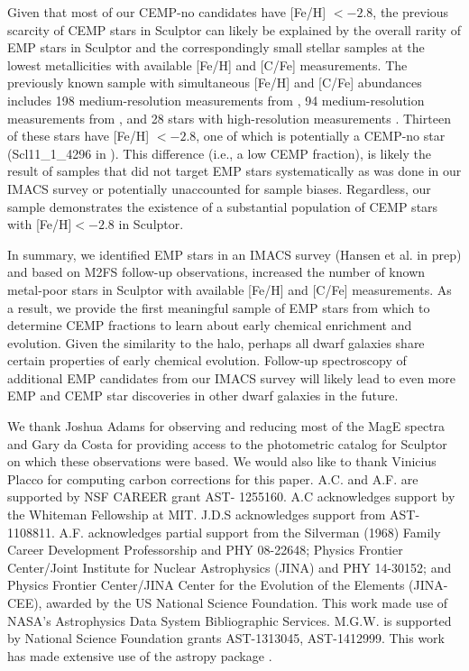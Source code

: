 \documentclass{emulateapj-rtx4}
\begin{document}
Given that most of our CEMP-no candidates have [Fe/H] $< -2.8$, the previous scarcity of CEMP stars in 
Sculptor can likely be explained by the overall rarity of EMP stars in Sculptor and the correspondingly small 
stellar samples at the lowest metallicities with available [Fe/H] and [C/Fe]
measurements. The previously known sample with simultaneous [Fe/H] and [C/Fe] abundances includes 
198 medium-resolution measurements from \citet{kgz+15}, 94 medium-resolution measurements from
\citet{lbp+16}, and 28 stars with high-resolution measurements 
\citep{svt+03, gsw+05, fks+10, tjh+10, kc+12, sht+13, sts+15,
jnm+15,sjf+15}. Thirteen of these stars have [Fe/H] $< -2.8$, one of which is potentially 
a CEMP-no star (Scl11\_1\_4296 in \citet{sjf+15}). This difference (i.e., a low CEMP fraction),
is likely the result of samples that did not target EMP stars systematically as was done in our
IMACS survey or potentially unaccounted for sample biases. Regardless, our sample demonstrates the existence of a substantial population of CEMP stars with [Fe/H]$< -2.8$ in Sculptor.

In summary,  we identified EMP stars in an IMACS survey (Hansen et al. in prep) and based on M2FS follow-up observations,
increased the number of known metal-poor stars in Sculptor with available [Fe/H] and [C/Fe] measurements.
As a result, we provide the first meaningful sample of EMP stars from which 
to determine CEMP fractions to learn about early chemical enrichment and evolution.
Given the similarity to the halo, perhaps all dwarf galaxies share certain properties of early chemical evolution.
Follow-up spectroscopy of additional EMP candidates from 
our IMACS survey will likely lead to even more EMP and CEMP star discoveries in other dwarf galaxies in the future.

\acknowledgements
We thank Joshua Adams for observing and reducing most of the MagE spectra
and Gary da Costa for providing access to the photometric catalog for Sculptor on which these observations were based. 
We would also like to thank Vinicius Placco for computing carbon corrections for this paper. A.C. and A.F. are supported by NSF CAREER grant AST- 1255160. A.C acknowledges support by 
the Whiteman Fellowship at MIT. J.D.S acknowledges support from
AST-1108811. A.F. acknowledges partial support 
from the Silverman (1968) Family Career Development Professorship and PHY 08-22648; Physics Frontier Center/Joint Institute for 
Nuclear Astrophysics (JINA) and PHY 14-30152; and Physics Frontier Center/JINA 
Center for the Evolution of the Elements (JINA-CEE), awarded by the US National 
Science Foundation. This work made use of NASA's Astrophysics Data System Bibliographic Services. M.G.W. is supported by National Science Foundation grants AST-1313045, AST-1412999.
This work has made extensive use of the astropy package \citep{astropy}.
\end{document}
